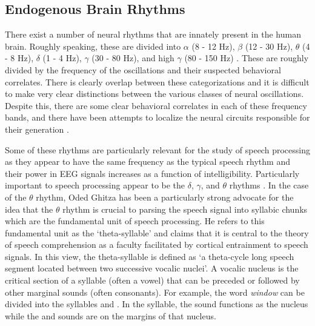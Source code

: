 \documentclass[titlepage]{article}
\begin{document}
  \subsection{Endogenous Brain Rhythms} \label{endogenousBrainRhythms}

    There exist a number of neural rhythms that are innately present in the
    human brain. Roughly speaking, these are divided into $\alpha$ (8 - 12 Hz),
    $\beta$ (12 - 30 Hz), $\theta$ (4 - 8 Hz), $\delta$ (1 - 4 Hz), $\gamma$
    (30 - 80 Hz), and high $\gamma$ (80 - 150 Hz)
    \cite{Muresan2008,Rangaswamy2002}. These are roughly divided by the
    frequency of the oscillations and their suspected behavioral correlates.
    There is clearly overlap between these categorizations and it is difficult
    to make very clear distinctions between the various classes of neural
    oscillations. Despite this, there are some clear behavioral correlates in
    each of these frequency bands, and there have been attempts to localize the
    neural circuits responsible for their generation \cite{Michel1992}.

    Some of these rhythms are particularly relevant for the study of speech
    processing as they appear to have the same frequency as the typical speech
    rhythm and their power in EEG signals increases as a function of
    intelligibility. Particularly important to speech processing appear to be
    the $\delta$, $\gamma$, and $\theta$ rhythms \cite{Ghitza2009,Meyer2018}.
    In the case of the $\theta$ rhythm, Oded Ghitza has been a particularly
    strong advocate for the idea that the $\theta$ rhythm is crucial to parsing
    the speech signal into syllabic chunks which are the fundamental unit of
    speech processing. He refers to this fundamental unit as the
    `theta-syllable' \cite{Ghitza2013a} and claims that it is central to the
    theory of speech comprehension as a faculty facilitated by cortical
    entrainment to speech signals. In this view, the theta-syllable is defined
    as `a theta-cycle long speech segment located between two successive vocalic
    nuclei'. A vocalic nucleus is the critical section of a syllable (often a
    vowel) that can be preceded or followed by other marginal sounds (often
    consonants). For example, the word \textit{window} can be divided into the
    syllables  and . In the 
    syllable, the  sound functions as the nucleus while the
     and  sounds are on the margins of that nucleus.
\end{document}
